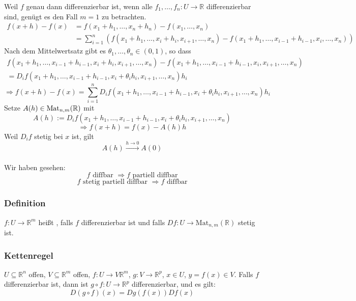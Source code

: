 Weil $f$ genau dann differenzierbar ist, wenn alle $f_1 , \dots , f_n: U \to \mathbb{R} $ differenzierbar sind, genügt es den Fall $m=1$ zu betrachten.
\begin{align*}
	f(x+h) - f(x) &= f(x_1+h_1, \dots ,x_n+h_n) - f(x_1, \dots, x_n) \\
	&= \sum^{n}_{i=1} \left( f(x_1+h_1, \dots,x_i+h_i,x_{i+1} ,\dots,x_n) - f(x_1+h_1, \dots,x_{i-1}+h_{i-1},x_{i} ,\dots,x_n) \right)
\end{align*}
Nach dem Mittelwertsatz gibt es $\theta_1, \dots , \theta_n \in (0,1)$, so dass
\begin{gather*}
	f(x_1+h_1, \dots,x_{i-1}+h_{i-1},x_i+h_i,x_{i+1} ,\dots,x_n) - f(x_1+h_1, \dots,x_{i-1}+h_{i-1},x_i,x_{i+1} ,\dots,x_n) \\
	= D_if(x_1+h_1, \dots,x_{i-1}+h_{i-1},x_{i}+\theta_ih_i,x_{i+1} ,\dots,x_n)h_i 
\end{gather*}
\[
	\Rightarrow f(x+h)-f(x)= \sum^{n}_{i=1}D_if(x_1+h_1, \dots,x_{i-1}+h_{i-1},x_{i}+\theta_ih_i,x_{i+1} ,\dots,x_n)h_i 
\]
Setze $A(h) \in \operatorname{Mat}_{n,m}(\mathbb{R})$ mit
\[
	A(h):= D_if(x_1+h_1, \dots,x_{i-1}+h_{i-1},x_{i}+\theta_ih_i,x_{i+1} ,\dots,x_n)
\]
\[
	\Rightarrow f(x+h)=f(x)-A(h)h
\]
Weil $D_if$ stetig bei $x$ ist, gilt
\[
	A(h) \stackrel{h \to 0}{\longrightarrow} A(0)
\]
\bewende \\
Wir haben gesehen: 
\[
	f \text{ diffbar } \Rightarrow f \text{ partiell diffbar}
\]
\[
	f \text{ stetig partiell diffbar } \Rightarrow f \text{ diffbar}
\]
\subsubsection{Definition} %
\label{ssub:definition}
$f: U \to \mathbb{R}^m$ heißt , falls $f$ differenzierbar ist und falls $Df: U \to \text{Mat}_{n,m}(\mathbb{R})$ stetig ist.

\subsubsection{Kettenregel} %
\label{ssub:kettenregel}
$U \subseteq \mathbb{R}^n$ offen, $V \subseteq \mathbb{R}^m$ offen, $f:U \to V \mathbb{R}^m$, $g: V \to \mathbb{R}^p$, $x \in U$, $y=f(x) \in V$. Falls $f$ 
differenzierbar ist, dann ist $g \circ f: U \to \mathbb{R}^p$ differenzierbar, und es gilt:
\[
	D(g \circ f)(x) = Dg(f(x))Df(x)
\]

